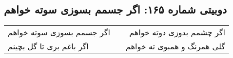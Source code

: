 \begin{center}
\section*{دوبیتی شماره ۱۶۵: اگر جسمم بسوزی سوته خواهم}
\label{sec:165}
\begin{longtable}{l p{0.5cm} r}
اگر جسمم بسوزی سوته خواهم
&&
اگر چشمم بدوزی دوته خواهم
\\
اگر باغم بری تا گل بچینم
&&
گلی همرنگ و همبوی ته خواهم
\\
\end{longtable}
\end{center}
